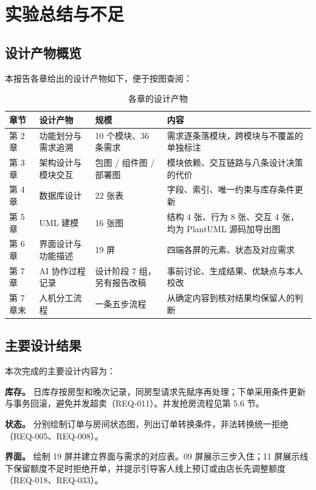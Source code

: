 \section{实验总结与不足}

\subsection{设计产物概览}

本报告各章给出的设计产物如下，便于按图查阅：

\begin{table}[H]
\centering
\caption{各章的设计产物}
\tabfont
\begin{tabularx}{\textwidth}{@{}L{2.2cm}L{4.2cm}L{2.6cm}X@{}}
\toprule
章节 & 设计产物 & 规模 & 内容 \\
\midrule
第 2 章 & 功能划分与需求追溯 & 10 个模块、36 条需求 & 需求逐条落模块，跨模块与不覆盖的单独标注 \\
第 3 章 & 架构设计与模块交互 & 包图 / 组件图 / 部署图 & 模块依赖、交互链路与八条设计决策的代价 \\
第 4 章 & 数据库设计 & 22 张表 & 字段、索引、唯一约束与库存条件更新 \\
第 5 章 & UML 建模 & 16 张图 & 结构 4 张、行为 8 张、交互 4 张，均为 PlantUML 源码加导出图 \\
第 6 章 & 界面设计与功能描述 & 19 屏 & 四端各屏的元素、状态及对应需求 \\
第 7 章 & AI 协作过程记录 & 设计阶段 7 组，另有报告改稿 & 事前讨论、生成结果、优缺点与本人校改 \\
第 7 章末 & 人机分工流程 & 一条五步流程 & 从确定内容到核对结果均保留人的判断 \\
\bottomrule
\end{tabularx}
\end{table}

\subsection{主要设计结果}

本次完成的主要设计内容为：

\textbf{库存。} 日库存按房型和晚次记录，同房型请求先赋序再处理；下单采用条件更新与事务回滚，避免并发超卖（REQ-011）。并发抢房流程见第 5.6 节。

\textbf{状态。} 分别绘制订单与房间状态图，列出订单转换条件，非法转换统一拒绝（REQ-005、REQ-008）。

\textbf{界面。} 绘制 19 屏并建立界面与需求的对应表。09 屏展示三步入住；11 屏展示线下保留额度不足时拒绝开单，并提示引导客人线上预订或由店长先调整额度（REQ-018、REQ-033）。

